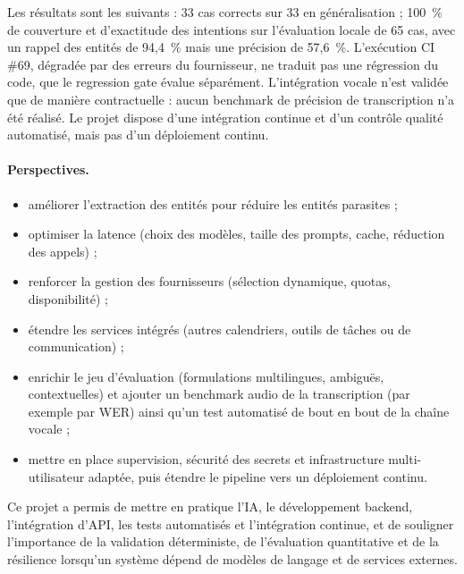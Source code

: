 \documentclass[11pt,a4paper,openany,oneside]{report}
\begin{document}
Les résultats sont les suivants : 33 cas corrects sur 33 en généralisation ; 100~\% de couverture et d'exactitude des intentions sur l'évaluation locale de 65 cas, avec un rappel des entités de 94,4~\% mais une précision de 57,6~\%. L'exécution CI \#69, dégradée par des erreurs du fournisseur, ne traduit pas une régression du code, que le regression gate évalue séparément. L'intégration vocale n'est validée que de manière contractuelle : aucun benchmark de précision de transcription n'a été réalisé. Le projet dispose d'une intégration continue et d'un contrôle qualité automatisé, mais pas d'un déploiement continu.

\paragraph{Perspectives.}
\begin{itemize}
\item améliorer l'extraction des entités pour réduire les entités parasites ;
\item optimiser la latence (choix des modèles, taille des prompts, cache, réduction des appels) ;
\item renforcer la gestion des fournisseurs (sélection dynamique, quotas, disponibilité) ;
\item étendre les services intégrés (autres calendriers, outils de tâches ou de communication) ;
\item enrichir le jeu d'évaluation (formulations multilingues, ambiguës, contextuelles) et ajouter un benchmark audio de la transcription (par exemple par WER) ainsi qu'un test automatisé de bout en bout de la chaîne vocale ;
\item mettre en place supervision, sécurité des secrets et infrastructure multi-utilisateur adaptée, puis étendre le pipeline vers un déploiement continu.
\end{itemize}
Ce projet a permis de mettre en pratique l'IA, le développement backend, l'intégration d'API, les tests automatisés et l'intégration continue, et de souligner l'importance de la validation déterministe, de l'évaluation quantitative et de la résilience lorsqu'un système dépend de modèles de langage et de services externes.
\end{document}
